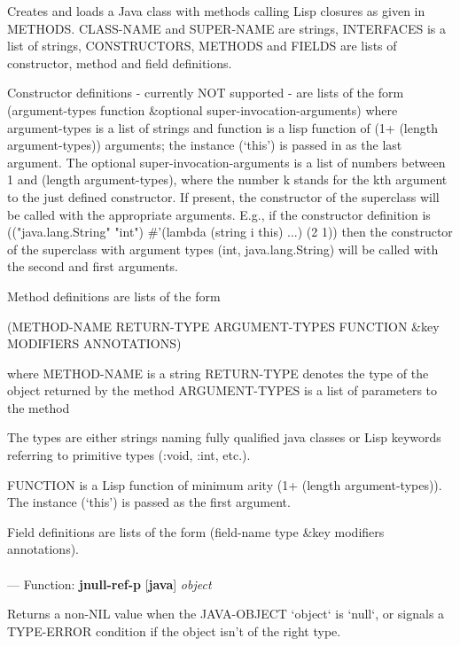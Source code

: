 \begin{adjustwidth}{5em}{5em}
Creates and loads a Java class with methods calling Lisp closures
   as given in METHODS.  CLASS-NAME and SUPER-NAME are strings,
   INTERFACES is a list of strings, CONSTRUCTORS, METHODS and FIELDS are
   lists of constructor, method and field definitions.

   Constructor definitions - currently NOT supported - are lists of the form
   (argument-types function \&optional super-invocation-arguments)
   where argument-types is a list of strings and function is a lisp function of
   (1+ (length argument-types)) arguments; the instance (`this') is passed in as
   the last argument. The optional super-invocation-arguments is a list of numbers
   between 1 and (length argument-types), where the number k stands for the kth argument
   to the just defined constructor. If present, the constructor of the superclass
   will be called with the appropriate arguments. E.g., if the constructor definition is
   (("java.lang.String" "int") \#'(lambda (string i this) ...) (2 1))
   then the constructor of the superclass with argument types (int, java.lang.String) will
   be called with the second and first arguments.

   Method definitions are lists of the form

     (METHOD-NAME RETURN-TYPE ARGUMENT-TYPES FUNCTION \&key MODIFIERS ANNOTATIONS)

   where 
      METHOD-NAME is a string 
      RETURN-TYPE denotes the type of the object returned by the method
      ARGUMENT-TYPES is a list of parameters to the method
      
        The types are either strings naming fully qualified java classes or Lisp keywords referring to 
        primitive types (:void, :int, etc.).

     FUNCTION is a Lisp function of minimum arity (1+ (length
     argument-types)). The instance (`this') is passed as the first
     argument.

   Field definitions are lists of the form (field-name type \&key modifiers annotations).
\end{adjustwidth}

\paragraph{}
\label{JAVA:JNULL-REF-P}
--- Function: \textbf{jnull-ref-p} [\textbf{java}] \textit{object}

\begin{adjustwidth}{5em}{5em}
Returns a non-NIL value when the JAVA-OBJECT `object` is `null`,
or signals a TYPE-ERROR condition if the object isn't of
the right type.
\end{adjustwidth}

